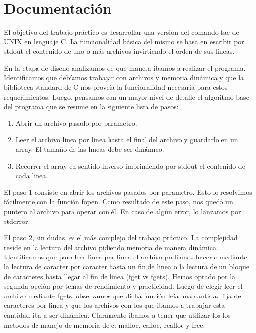 \documentclass[a4paper,11pt]{article}
\begin{document}
\section{Documentaci\'on}
El objetivo del trabajo pr\'actico es desarrollar una version del comando tac de UNIX en lenguaje C. La funcionalidad b\'asica del mismo se basa en escribir por stdout el contenido de uno o m\'as archivos invirtiendo el orden de sus lineas.

En la etapa de diseno analizamos de que manera ibamos a realizar el programa. Identificamos que deb\'iamos trabajar con archivos y memoria din\'amica y que la biblioteca standard de C nos prove\'ia la funcionalidad necesaria para estos requerimientos. Luego, pensamos con un mayor nivel de detalle el algoritmo base del programa que se resume en la siguiente lista de pasos:
\begin{enumerate}
	\item Abrir un archivo pasado por parametro.
	\item Leer el archivo linea por linea hasta el final del archivo y guardarlo en un array. El tama\~no de las lineas debe ser din\'amico.
	\item Recorrer el array en sentido inverso imprimiendo por stdout el contenido de cada linea.
\end{enumerate}

El paso 1 consiste en abrir los archivos pasados por parametro. Esto lo resolvimos f\'acilmente con la funci\'on fopen. Como resultado de este paso, nos qued\'o un puntero al archivo para operar con \'el. En caso de alg\'un error, lo lanzamos por stderror.

El paso 2, sin dudas, es el m\'as complejo del trabajo pr\'actico. La complejidad reside en la lectura del archivo pidiendo memoria de manera din\'amica. 
Identificamos que para leer linea por linea el archivo podiamos hacerlo mediante la lectura de caracter por caracter hasta un fin de linea o la lectura de un bloque de caracteres hasta llegar al fin de linea (fget vs fgets). Hemos optado por la segunda opci\'on por temas de rendimiento y practicidad.
Luego de elegir leer el archivo mediante fgets, observamos que dicha funci\'on le\'ia una cantidad fija de caracteres por linea y que los archivos con los que ibamos a trabajar esta cantidad iba a ser din\'amica. Claramente ibamos a tener que utilizar los los metodos de manejo de memoria de c: malloc, calloc, realloc y free.
\end{document}
